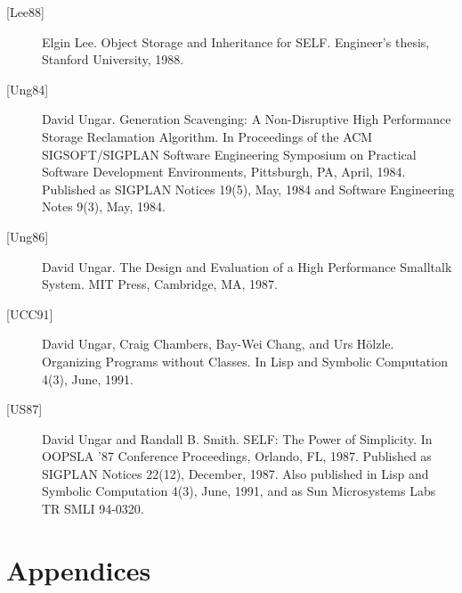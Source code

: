 \documentclass[letterpaper,10pt,english]{sphinxmanual}
\begin{document}
\begin{description}
\item[{{[}Lee88{]}}] \leavevmode
Elgin Lee. Object Storage and Inheritance for SELF. Engineer’s thesis, Stanford University, 1988.

\item[{{[}Ung84{]}}] \leavevmode
David Ungar. Generation Scavenging: A Non-Disruptive High Performance Storage Reclamation Algorithm. In Proceedings of the ACM SIGSOFT/SIGPLAN Software Engineering Symposium on Practical Software Development Environments, Pittsburgh, PA, April, 1984. Published as SIGPLAN Notices 19(5), May, 1984 and Software Engineering Notes 9(3), May, 1984.

\item[{{[}Ung86{]}}] \leavevmode
David Ungar. The Design and Evaluation of a High Performance Smalltalk System. MIT Press, Cambridge, MA, 1987.

\item[{{[}UCC91{]}}] \leavevmode
David Ungar, Craig Chambers, Bay-Wei Chang, and Urs Hölzle. Organizing Programs without Classes. In Lisp and Symbolic Computation 4(3), June, 1991.

\item[{{[}US87{]}}] \leavevmode
David Ungar and Randall B. Smith. SELF: The Power of Simplicity. In OOPSLA ’87 Conference Proceedings, Orlando, FL, 1987. Published as SIGPLAN Notices 22(12), December, 1987. Also published in Lisp and Symbolic Computation 4(3), June, 1991, and as Sun Microsystems Labs TR SMLI 94-0320.

\end{description}


\chapter{Appendices}
\label{appendices::doc}\label{appendices:appendices}
\end{document}
